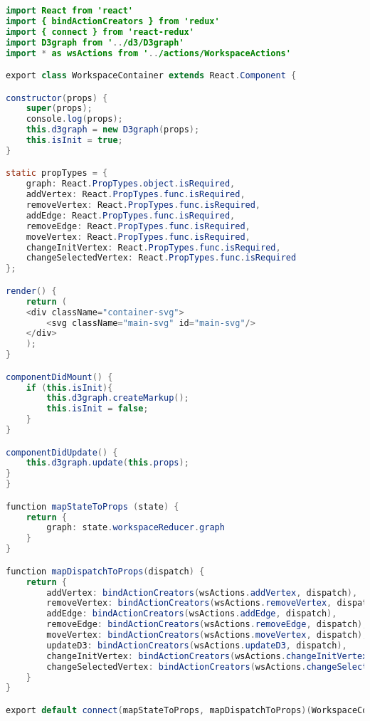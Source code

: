 \begin{lstlisting}[language=Java, 
label=lst:url_assign, 
caption={Реализация контейнера WorkspaceContainer.}]
import React from 'react'
import { bindActionCreators } from 'redux'
import { connect } from 'react-redux'
import D3graph from '../d3/D3graph'
import * as wsActions from '../actions/WorkspaceActions'

export class WorkspaceContainer extends React.Component {

constructor(props) {
	super(props);
	console.log(props);
	this.d3graph = new D3graph(props);
	this.isInit = true;
}

static propTypes = {
	graph: React.PropTypes.object.isRequired,
	addVertex: React.PropTypes.func.isRequired,
	removeVertex: React.PropTypes.func.isRequired,
	addEdge: React.PropTypes.func.isRequired,
	removeEdge: React.PropTypes.func.isRequired,
	moveVertex: React.PropTypes.func.isRequired,
	changeInitVertex: React.PropTypes.func.isRequired,
	changeSelectedVertex: React.PropTypes.func.isRequired
};

render() {
	return (
	<div className="container-svg">
		<svg className="main-svg" id="main-svg"/>
	</div>
	);
}

componentDidMount() {
	if (this.isInit){
		this.d3graph.createMarkup();
		this.isInit = false;
	}
}

componentDidUpdate() {
	this.d3graph.update(this.props);
}
}

function mapStateToProps (state) {
	return {
		graph: state.workspaceReducer.graph
	}
}

function mapDispatchToProps(dispatch) {
	return {
		addVertex: bindActionCreators(wsActions.addVertex, dispatch),
		removeVertex: bindActionCreators(wsActions.removeVertex, dispatch),
		addEdge: bindActionCreators(wsActions.addEdge, dispatch),
		removeEdge: bindActionCreators(wsActions.removeEdge, dispatch),
		moveVertex: bindActionCreators(wsActions.moveVertex, dispatch),
		updateD3: bindActionCreators(wsActions.updateD3, dispatch),
		changeInitVertex: bindActionCreators(wsActions.changeInitVertex, dispatch),
		changeSelectedVertex: bindActionCreators(wsActions.changeSelectedVertex, dispatch)
	}
}

export default connect(mapStateToProps, mapDispatchToProps)(WorkspaceContainer);
\end{lstlisting}

